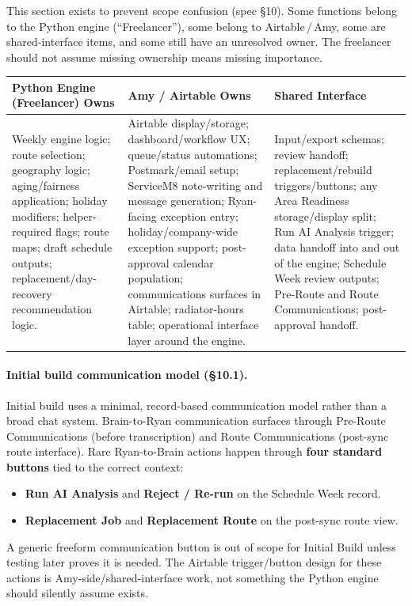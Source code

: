 \documentclass[12pt]{article}
\begin{document}
This section exists to prevent scope confusion (spec \S10).
Some functions belong to the Python engine (``Freelancer''), some belong to Airtable\,/\,Amy, some are shared-interface items, and some still have an unresolved owner.
The freelancer should not assume missing ownership means missing importance.

\medskip
{\small
\begin{longtable}{p{4.5cm}p{4.5cm}p{4.5cm}}
\toprule
\textbf{Python Engine (Freelancer) Owns} & \textbf{Amy / Airtable Owns} & \textbf{Shared Interface} \\
\midrule
Weekly engine logic; route selection; geography logic; aging/fairness application; holiday modifiers; helper-required flags; route maps; draft schedule outputs; replacement/day-recovery recommendation logic. &
Airtable display/storage; dashboard/workflow UX; queue/status automations; Postmark/email setup; ServiceM8 note-writing and message generation; Ryan-facing exception entry; holiday/company-wide exception support; post-approval calendar population; communications surfaces in Airtable; radiator-hours table; operational interface layer around the engine. &
Input/export schemas; review handoff; replacement/rebuild triggers/buttons; any Area Readiness storage/display split; Run AI Analysis trigger; data handoff into and out of the engine; Schedule Week review outputs; Pre-Route and Route Communications; post-approval handoff. \\
\bottomrule
\end{longtable}
}

\paragraph{Initial build communication model (\S10.1).}
Initial build uses a minimal, record-based communication model rather than a broad chat system.
Brain-to-Ryan communication surfaces through Pre-Route Communications (before transcription) and Route Communications (post-sync route interface).
Rare Ryan-to-Brain actions happen through \textbf{four standard buttons} tied to the correct context:
\begin{itemize}
    \item \textbf{Run AI Analysis} and \textbf{Reject / Re-run} on the Schedule Week record.
    \item \textbf{Replacement Job} and \textbf{Replacement Route} on the post-sync route view.
\end{itemize}
A generic freeform communication button is out of scope for Initial Build unless testing later proves it is needed.
The Airtable trigger/button design for these actions is Amy-side/shared-interface work, not something the Python engine should silently assume exists.
\end{document}
